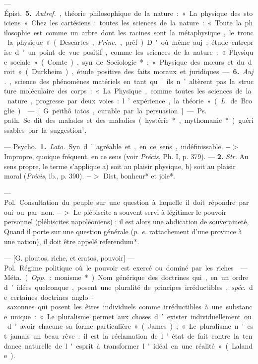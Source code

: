 \begin{itemize}[leftmargin=1cm, label=, itemsep=1pt]
 — \si{Épist.} {\bf 5.}
{\it Autref.}, théorie philosophique de la
nature : « La physique des stoiciens ». Chez les cartésiens : toutes
les sciences de la nature : « Toute la
philosophie est comme un arbre
dont les racines sont la métaphysique, le tronc la physique » (Descartes, {\it Princ.}, préf.). D'où même
auj. : étude entreprise d’un point de
vue positif, comme les sciences de
la nature : « Physique sociale »
(Comte), syn. de Sociologie* ; « Physique des mœurs et du droit » (Durkheim), étude positive des faits moraux et juridiques. — {\bf 6.} {\it Auj.},
science des phénomènes matériels en
tant qu'ils n’altèrent pas la structure moléculaire des corps : « La
Physique, comme toutes les sciences
de la nature, progresse par deux
voies : l’expérience, la théorie »
({\it L.} de Broglie).

 — [G. peïthô iatos, curable
par la persuasion] — \si{Ps. path.} Se
dit des malades et des maladies
(hystérie*, mythomanie*) guérissables par la suggestion$^1$.

 — \si{Psycho.} {\bf 1.} {\it Lato.} Syn.
d’agréable et, en ce sens, indéfinissable. $->$ Impropre, quoique fréquent, en ce sens (voir {\it Précis}, Ph. I,
p. 379). — {\bf 2.} {\it Str.} Au sens propre,
le terme s'applique a) soit au
plaisir physique, b) soit au plaisir
moral ({\it Précis}, ib., p. 390). $->$ Dist,
bonheur* et joie*.

 — \si{Pol.} Consultation du
peuple sur une question à laquelle
il doit répondre par oui ou par non.
$->$ Le plébiscite a souvent servi à
légitimer le pouvoir personnel (plébiscites napoléoniens) : il est alors
une abdication de souveraineté,
Quand il porte sur une question
générale ({\it p. e.} rattachement d'une
province à une nation), il doit être
appelé referendum*.

 — [G. ploutos, riche, et
cratos, pouvoir] — \si{Pol.} Régime politique où le pouvoir est exercé ou
dominé par les riches.

 — \si{Méta.} ({\it Opp.} : monisme*).
Nom générique des doctrines qui,
en un ordre d’idées quelconque,
posent une pluralité de principes
irréductibles, {\it spéc.} de certaines doctrines anglo-saxonnes qui posent
les êtres individuels comme irréductibles à une substance unique :
« Le pluralisme permet aux choses
d’exister individuellement ou d’avoir
chacune sa forme particulière »
(James) ; « Le pluralisme n'est
jamais un beau rêve : il est la réclamation de l’état de fait contre la
tendance naturelle de l'esprit à
transformer l'idéal en une réalité »
(Lalande).


\end{itemize}
